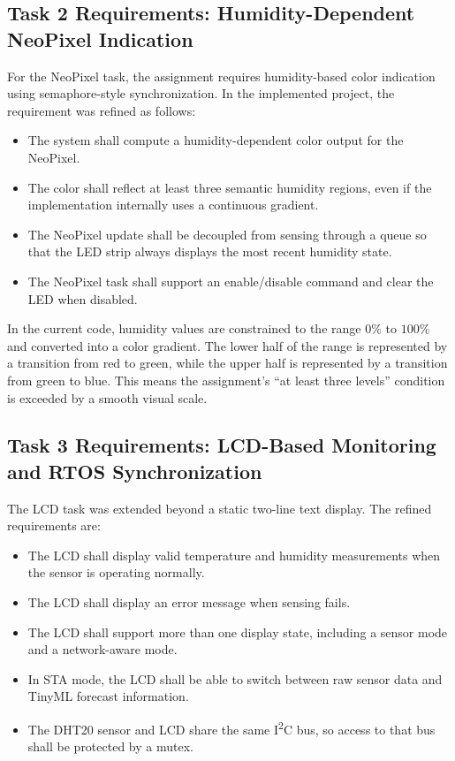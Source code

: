 \subsection{Task 2 Requirements: Humidity-Dependent NeoPixel Indication}
For the NeoPixel task, the assignment requires humidity-based color indication
using semaphore-style synchronization. In the implemented project, the
requirement was refined as follows:
\begin{itemize}
  \item The system shall compute a humidity-dependent color output for the
  NeoPixel.
  \item The color shall reflect at least three semantic humidity regions, even
  if the implementation internally uses a continuous gradient.
  \item The NeoPixel update shall be decoupled from sensing through a queue so
  that the LED strip always displays the most recent humidity state.
  \item The NeoPixel task shall support an enable/disable command and clear the
  LED when disabled.
\end{itemize}

In the current code, humidity values are constrained to the range
\(0\%\) to \(100\%\) and converted into a color gradient. The lower half of the
range is represented by a transition from red to green, while the upper half is
represented by a transition from green to blue. This means the assignment's
``at least three levels'' condition is exceeded by a smooth visual scale.

\subsection{Task 3 Requirements: LCD-Based Monitoring and RTOS
Synchronization}
The LCD task was extended beyond a static two-line text display. The refined
requirements are:
\begin{itemize}
  \item The LCD shall display valid temperature and humidity measurements when
  the sensor is operating normally.
  \item The LCD shall display an error message when sensing fails.
  \item The LCD shall support more than one display state, including a sensor
  mode and a network-aware mode.
  \item In STA mode, the LCD shall be able to switch between raw sensor data
  and TinyML forecast information.
  \item The DHT20 sensor and LCD share the same I\textsuperscript{2}C bus, so
  access to that bus shall be protected by a mutex.
\end{itemize}

